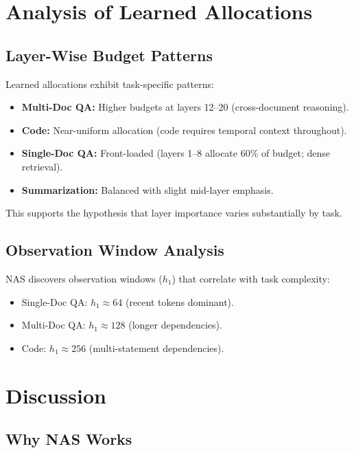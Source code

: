 \documentclass[11pt,a4paper]{article}
\begin{document}
\section{Analysis of Learned Allocations}

\subsection{Layer-Wise Budget Patterns}

Learned allocations exhibit task-specific patterns:

\begin{itemize}
    \item \textbf{Multi-Doc QA:} Higher budgets at layers 12–20 (cross-document reasoning).
    \item \textbf{Code:} Near-uniform allocation (code requires temporal context throughout).
    \item \textbf{Single-Doc QA:} Front-loaded (layers 1–8 allocate 60\% of budget; dense retrieval).
    \item \textbf{Summarization:} Balanced with slight mid-layer emphasis.
\end{itemize}

This supports the hypothesis that layer importance varies substantially by task.

\subsection{Observation Window Analysis}

NAS discovers observation windows ($h_1$) that correlate with task complexity:
\begin{itemize}
    \item Single-Doc QA: $h_1 \approx 64$ (recent tokens dominant).
    \item Multi-Doc QA: $h_1 \approx 128$ (longer dependencies).
    \item Code: $h_1 \approx 256$ (multi-statement dependencies).
\end{itemize}

\section{Discussion}

\subsection{Why NAS Works}
\end{document}

